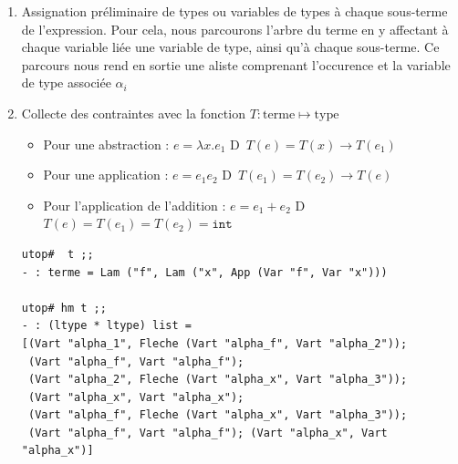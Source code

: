 \documentclass[11pt]{book}
\newcommand{\imp}{{\letterimp D}\hspace{0.1cm}}
\begin{document}
\begin{enumerate}
  \item Assignation préliminaire de types ou variables de types à chaque sous-terme de l'expression.
  Pour cela, nous parcourons  l'arbre du terme en y affectant à chaque variable liée une variable de type, ainsi qu'à
  chaque sous-terme. Ce parcours nous rend en sortie une aliste comprenant l'occurence et la variable de type associée $\alpha_i$
 \begin{center} 
\end{center}

  \item Collecte des contraintes avec la fonction $T: \mathrm{terme} \mapsto \mathrm{type}$ 
    \begin{itemize}
      \item Pour une abstraction :  $e = \lambda x.e_1 $ \imp\ $T(e) = T(x) \rightarrow T(e_1) $
      \item Pour une application :  $e = e_1 e_2$ \imp\ $T(e_1) = T(e_2) \rightarrow T(e) $
      \item Pour l'application de l'addition  : $e=e_1+e_2$ \imp\ $T(e)= T(e_1) = T(e_2) = \mathtt{int} $
    \end{itemize}  

\begin{Verbatim}
utop#  t ;;
- : terme = Lam ("f", Lam ("x", App (Var "f", Var "x")))

utop# hm t ;;
- : (ltype * ltype) list =
[(Vart "alpha_1", Fleche (Vart "alpha_f", Vart "alpha_2"));
 (Vart "alpha_f", Vart "alpha_f");
 (Vart "alpha_2", Fleche (Vart "alpha_x", Vart "alpha_3"));
 (Vart "alpha_x", Vart "alpha_x");
 (Vart "alpha_f", Fleche (Vart "alpha_x", Vart "alpha_3"));
 (Vart "alpha_f", Vart "alpha_f"); (Vart "alpha_x", Vart "alpha_x")]
\end{Verbatim}
    

\end{enumerate}
\end{document}

